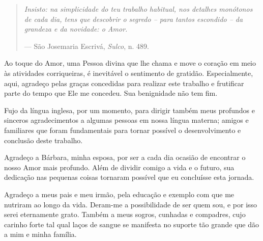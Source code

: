 %


\begin{quotation}
    \itshape
    Insisto: na simplicidade do teu \emph{trabalho habitual}, nos detalhes monótonos de cada dia, tens que descobrir o segredo -- para tantos escondido -- da grandeza e da novidade: o Amor.

    \noindent --- S\~ao Josemaria Escriv\'a, \emph{Sulco}, n. 489.
\end{quotation}

\vspace{3em}

Ao toque do Amor, uma Pessoa divina que lhe chama e move o cora\c c\~ao em meio \`as atividades corriqueiras, \'e inevit\'avel o sentimento de gratid\~ao. Especialmente, aqui, agrade\c co pelas gra\c cas concedidas para realizar este trabalho e frutificar parte do tempo que Ele me concedeu. Sua benignidade n\~ao tem fim.

Fujo da l\'ingua inglesa, por um momento, para dirigir tamb\'em meus profundos e sinceros agradecimentos a algumas pessoas em nossa l\'ingua materna; amigos e familiares que foram fundamentais para tornar poss\'ivel o desenvolvimento e conclus\~ao deste trabalho.


Agrade\c co a B\'arbara, minha esposa, por ser a cada dia ocasi\~ao de encontrar o nosso Amor mais profundo. Al\'em de dividir comigo a vida e o futuro, sua dedica\c c\~ao nas pequenas coisas tornaram poss\'ivel que eu conclu\'isse esta jornada.

Agrade\c co a meus pais e meu irm\~ao, pela educa\c c\~ao e exemplo com que me nutriram ao longo da vida. Deram-me a possibilidade de ser quem sou, e por isso serei eternamente grato. Tamb\'em a meus sogros, cunhadas e compadres, cujo carinho forte tal qual la\c cos de sangue se manifesta no suporte t\~ao grande que d\~ao a mim e minha fam\'ilia.

